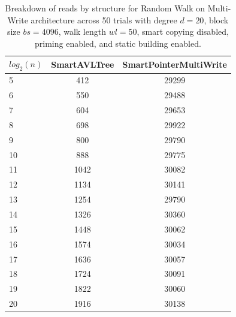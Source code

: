 \begin{table}[]
\centering
\begin{tabular}{|l|c|c|}
$log_2(n)$ & SmartAVLTree & SmartPointerMultiWrite \\ \hline
5 & 412 & 29299 \\ \hline
6 & 550 & 29488 \\ \hline
7 & 604 & 29653 \\ \hline
8 & 698 & 29922 \\ \hline
9 & 800 & 29790 \\ \hline
10 & 888 & 29775 \\ \hline
11 & 1042 & 30082 \\ \hline
12 & 1134 & 30141 \\ \hline
13 & 1254 & 29790 \\ \hline
14 & 1326 & 30360 \\ \hline
15 & 1448 & 30062 \\ \hline
16 & 1574 & 30034 \\ \hline
17 & 1636 & 30057 \\ \hline
18 & 1724 & 30091 \\ \hline
19 & 1822 & 30060 \\ \hline
20 & 1916 & 30138 \\ \hline
\end{tabular}
\caption{Breakdown of reads by structure for Random Walk on Multi-Write architecture across 50 trials with degree $d=20$, block size $bs=4096$, walk length $wl=50$, smart copying disabled, priming enabled, and static building enabled.}
    \label{tab:reads_by_structure_rw_d20_bs4096_trials50_copiesfalse_primetrue_staticinsertiontrue_wl50_ptmultiwrite_movetrue}
\end{table}

